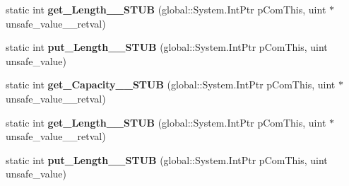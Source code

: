 \begin{DoxyCompactItemize}
static int {\bfseries get\+\_\+\+Length\+\_\+\+\_\+\+S\+T\+UB} (global\+::\+System.\+Int\+Ptr p\+Com\+This, uint $\ast$unsafe\+\_\+value\+\_\+\+\_\+retval)
\item 
\mbox{\label{struct_windows_1_1_storage_1_1_streams_1_1_i_buffer_____impl_1_1_vtbl_a80544026998fc1559ccd7885d251ce1b}} 
static int {\bfseries put\+\_\+\+Length\+\_\+\+\_\+\+S\+T\+UB} (global\+::\+System.\+Int\+Ptr p\+Com\+This, uint unsafe\+\_\+value)
\item 
\mbox{\label{struct_windows_1_1_storage_1_1_streams_1_1_i_buffer_____impl_1_1_vtbl_a0edf8e49726df558522286d08c40d999}} 
static int {\bfseries get\+\_\+\+Capacity\+\_\+\+\_\+\+S\+T\+UB} (global\+::\+System.\+Int\+Ptr p\+Com\+This, uint $\ast$unsafe\+\_\+value\+\_\+\+\_\+retval)
\item 
\mbox{\label{struct_windows_1_1_storage_1_1_streams_1_1_i_buffer_____impl_1_1_vtbl_abddf84bc05273d8c2287462bf3ba0ed9}} 
static int {\bfseries get\+\_\+\+Length\+\_\+\+\_\+\+S\+T\+UB} (global\+::\+System.\+Int\+Ptr p\+Com\+This, uint $\ast$unsafe\+\_\+value\+\_\+\+\_\+retval)
\item 
\mbox{\label{struct_windows_1_1_storage_1_1_streams_1_1_i_buffer_____impl_1_1_vtbl_a80544026998fc1559ccd7885d251ce1b}} 
static int {\bfseries put\+\_\+\+Length\+\_\+\+\_\+\+S\+T\+UB} (global\+::\+System.\+Int\+Ptr p\+Com\+This, uint unsafe\+\_\+value)
\end{DoxyCompactItemize}
